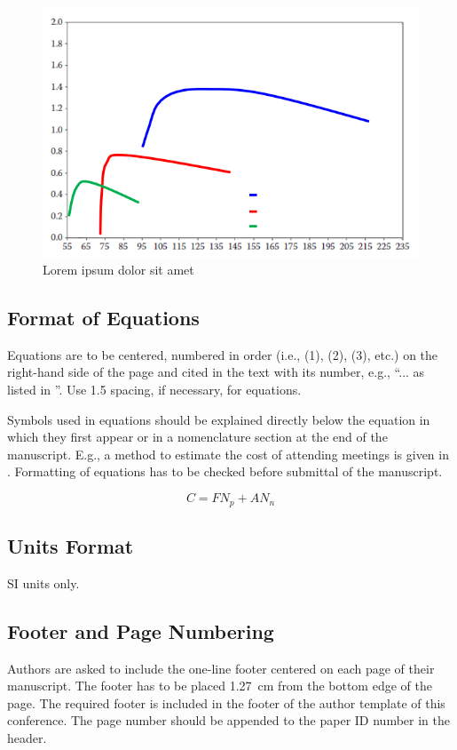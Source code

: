 \begin{figure}[h!]
    \centering
    \includegraphics[scale=0.6]{figures/diagram.png}
    \caption{Lorem ipsum dolor sit amet}
    \label{fig:diagram}
\end{figure}

\subsection{Format of Equations}
Equations are to be centered, numbered in order (i.e., (1), (2), (3), etc.) on the right-hand side of the page and cited in the text with its number, e.g., ``... as listed in ”. Use 1.5 spacing, if necessary, for equations.  

Symbols used in equations should be explained directly below the equation in which they first appear or in a nomenclature section at the end of the manuscript. E.g., a method \citep{Cheap1986} to estimate the cost of attending meetings is given in . Formatting of equations has to be checked before submittal of the manuscript.

\begin{equation}
    C=FN_p+AN_n
    \label{eq:fn+an}
\end{equation}

\subsection{Units Format}
SI units only.

\subsection{Footer and Page Numbering}
Authors are asked to include the one-line footer centered on each page of their manuscript. The footer has to be placed \SI{1.27}{cm} from the bottom edge of the page. The required footer is included in the footer of the author template of this conference. The page number should be appended to the paper ID number in the header.
